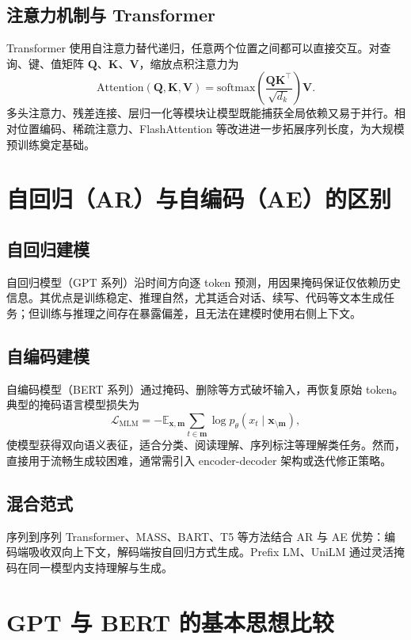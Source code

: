 \documentclass[UTF8,zihao=-4]{ctexart}
\begin{document}
\subsection{注意力机制与 Transformer}
Transformer 使用自注意力替代递归，任意两个位置之间都可以直接交互。对查询、键、值矩阵 $\mathbf{Q}$、$\mathbf{K}$、$\mathbf{V}$，缩放点积注意力为
\begin{equation}
  \mathrm{Attention}(\mathbf{Q}, \mathbf{K}, \mathbf{V}) = \mathrm{softmax}\left( \frac{\mathbf{Q}\mathbf{K}^{\top}}{\sqrt{d_k}} \right) \mathbf{V}.
\end{equation}
多头注意力、残差连接、层归一化等模块让模型既能捕获全局依赖又易于并行。相对位置编码、稀疏注意力、FlashAttention 等改进进一步拓展序列长度，为大规模预训练奠定基础。

\section{自回归（AR）与自编码（AE）的区别}
\subsection{自回归建模}
自回归模型（GPT 系列）沿时间方向逐 token 预测，用因果掩码保证仅依赖历史信息。其优点是训练稳定、推理自然，尤其适合对话、续写、代码等文本生成任务；但训练与推理之间存在暴露偏差，且无法在建模时使用右侧上下文。

\subsection{自编码建模}
自编码模型（BERT 系列）通过掩码、删除等方式破坏输入，再恢复原始 token。典型的掩码语言模型损失为
\begin{equation}
  \mathcal{L}_{\text{MLM}} = - \mathbb{E}_{\mathbf{x}, \mathbf{m}} \sum_{t \in \mathbf{m}} \log p_{\theta}(x_t \mid \mathbf{x}_{\setminus \mathbf{m}}),
\end{equation}
使模型获得双向语义表征，适合分类、阅读理解、序列标注等理解类任务。然而，直接用于流畅生成较困难，通常需引入 encoder-decoder 架构或迭代修正策略。

\subsection{混合范式}
序列到序列 Transformer、MASS、BART、T5 等方法结合 AR 与 AE 优势：编码端吸收双向上下文，解码端按自回归方式生成。Prefix LM、UniLM 通过灵活掩码在同一模型内支持理解与生成。

\section{GPT 与 BERT 的基本思想比较}
\end{document}
